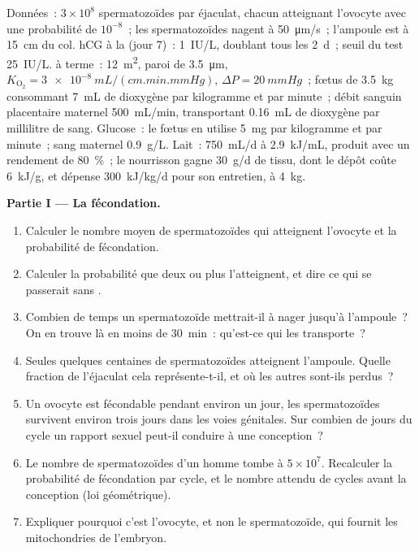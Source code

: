 \begin{problem}
\label{pb:b2:mammal-reproduction:1}
Données~: $3\times 10^{8}$ spermatozoïdes par éjaculat, chacun atteignant
l'ovocyte avec une probabilité de $10^{-8}$~; les spermatozoïdes nagent à
\qty{50}{\micro m/s}~; l'ampoule est à \qty{15}{cm} du col. hCG à la
 (jour 7)~: \qty{1}{IU/L}, doublant tous les \qty{2}{d}~; seuil
du test \qty{25}{IU/L}.  à terme~: \qty{12}{m^2}, paroi de
\qty{3.5}{\micro m}, $K_{\mathrm{O_2}} = \qty{3e-8}{mL/(cm.min.mmHg)}$,
$\Delta P = \qty{20}{mmHg}$~; fœtus de \qty{3.5}{kg} consommant
\qty{7}{mL} de dioxygène par kilogramme et par minute~; débit sanguin
placentaire maternel \qty{500}{mL/min}, transportant \qty{0.16}{mL} de
dioxygène par millilitre de sang. Glucose~: le fœtus en utilise
\qty{5}{mg} par kilogramme et par minute~; sang maternel
\qty{0.9}{g/L}. Lait~: \qty{750}{mL/d} à \qty{2.9}{kJ/mL}, produit
avec un rendement de \qty{80}{\%}~; le nourrisson gagne \qty{30}{g/d}
de tissu, dont le dépôt coûte \qty{6}{kJ/g}, et dépense
\qty{300}{kJ/kg/d} pour son entretien, à \qty{4}{kg}.

\medskip
\noindent\textbf{Partie I --- La fécondation.}
\begin{enumerate}
  \item Calculer le nombre moyen de spermatozoïdes qui atteignent
        l'ovocyte et la probabilité de fécondation.
  \item Calculer la probabilité que deux ou plus l'atteignent, et dire
        ce qui se passerait sans .
  \item Combien de temps un spermatozoïde mettrait-il à nager jusqu'à
        l'ampoule~? On en trouve là en moins de \qty{30}{min}~: qu'est-ce
        qui les transporte~?
  \item Seules quelques centaines de spermatozoïdes atteignent
        l'ampoule. Quelle fraction de l'éjaculat cela représente-t-il, et
        où les autres sont-ils perdus~?
  \item Un ovocyte est fécondable pendant environ un jour, les
        spermatozoïdes survivent environ trois jours dans les voies
        génitales. Sur combien de jours du cycle un rapport sexuel
        peut-il conduire à une conception~?
  \item Le nombre de spermatozoïdes d'un homme tombe à $5\times 10^{7}$.
        Recalculer la probabilité de fécondation par cycle, et le nombre
        attendu de cycles avant la conception (loi géométrique).
  \item Expliquer pourquoi c'est l'ovocyte, et non le spermatozoïde, qui
        fournit les mitochondries de l'embryon.
\end{enumerate}


\end{problem}
